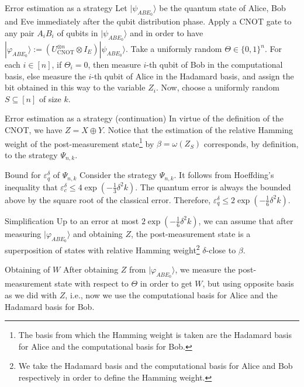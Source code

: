 \documentclass{beamer}
\begin{document}
\begin{frame}{Error estimation as a strategy}
Let $|\psi_{ABE_0} \rangle$ be the quantum state of Alice, Bob and Eve immediately after the qubit distribution phase. Apply a CNOT gate to any pair $A_i B_i$ of qubits in $|\psi_{ABE_0} \rangle$ and in order to have $|\varphi_{ABE_0} \rangle := (U_{\text{CNOT}}^{\otimes n} \otimes I_E) |\psi_{ABE_0} \rangle$. Take a uniformly random $\Theta \in \{0,1\}^n$. For each $i\in[n]$, if $\Theta_i = 0$, then measure $i$-th qubit of Bob in the computational basis, else measure the $i$-th qubit of Alice in the Hadamard basis, and assign the bit obtained in this way to the variable $Z_i$. Now, choose a uniformly random $S \subseteq [n]$ of size $k$. 
\end{frame}

\begin{frame}{Error estimation as a strategy (continuation)}
In virtue of the definition of the CNOT, we have $Z = X \oplus Y$. Notice that the estimation of the relative Hamming weight of the post-measurement state\footnote{The basis from which the Hamming weight is taken are the Hadamard basis for Alice and the computational
basis for Bob.} by $\beta = \omega(Z_S)$ corresponds, by definition, to the strategy $\Psi_{n,k}$.
\end{frame}


\begin{frame}{Bound for $\varepsilon_q^{\delta}$ of $\Psi_{n,k}$}
Consider the strategy $\Psi_{n,k}$. It follows from Hoeffding's inequality that $\varepsilon_c^{\delta} \leq 4\exp\left(- \frac{1}{3}\delta^2 k \right)$. The quantum error is always the bounded above by the square root of the classical error. Therefore, $\varepsilon_q^{\delta} \leq 2\exp\left(- \frac{1}{6}\delta^2 k \right)$.
\end{frame}


\begin{frame}{Simplification}
Up to an error at most $2\exp\left(- \frac{1}{6}\delta^2 k \right)$, we can assume that after measuring $|\varphi_{A B E_0}\rangle$ and obtaining $Z$, the post-measurement state is a superposition of states with relative Hamming weight\footnote{We take the Hadamard basis and the computational
basis for Alice and Bob respectively in order to define the Hamming weight.} $\delta$-close to $\beta$.
\end{frame}

\begin{frame}{Obtaining of $W$}
After obtaining $Z$ from $|\varphi_{A B E_0}\rangle$, we measure the post-measurement state  with respect to $\Theta$ in order to get $W$, but using opposite basis as we did with $Z$, i.e., now we use the computational basis for Alice and the Hadamard basis for Bob.
\end{frame}
\end{document}
